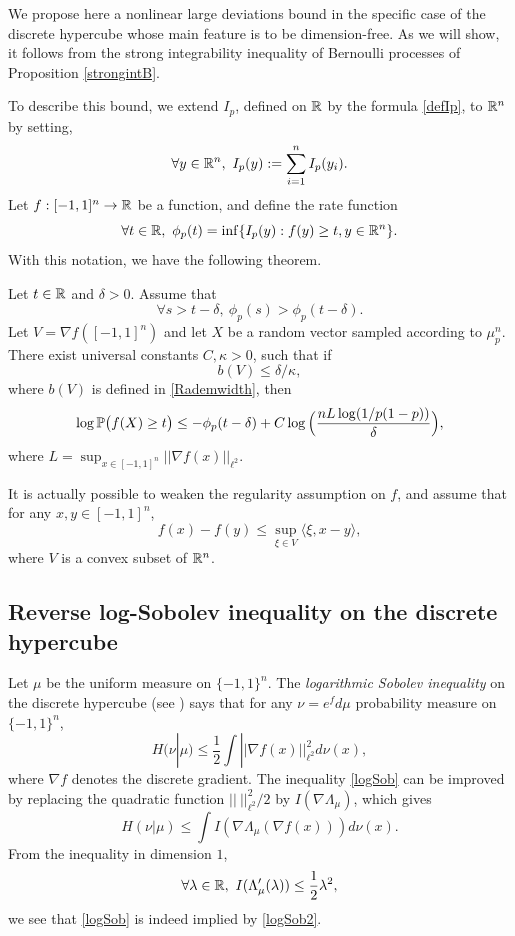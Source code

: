\documentclass[a4paper,oneside,11pt]{article}
\begin{document}
We propose here a nonlinear large deviations bound in the specific case of the discrete hypercube whose main feature is to be dimension-free. As we will show, it follows from the strong integrability inequality of Bernoulli processes of Proposition \ref{strongintB}. 

To describe this bound, we extend $I_p$, defined on $\mathbb{R}$ by the formula \eqref{defIp}, to $\mathbb{R}^n$ by setting,
$$ \forall y \in \mathbb{R}^n, \ I_p(y) := \sum_{i=1}^n I_p(y_i).$$
Let  $f : [-1,1]^n \to \mathbb{R}$ be a function, and define the rate function
$$ \forall t \in \mathbb{R}, \ \phi_p(t) = \inf\{ I_p(y) : f(y) \geq t, y \in \mathbb{R}^n \}.$$
With this notation, we have the following theorem.
\begin{The}\label{NL}Let $t \in \mathbb{R}$ and $\delta>0$. Assume that
$$ \forall s>t-\delta, \ \phi_p(s) > \phi_p(t-\delta).$$
 Let $V = \nabla f([-1,1]^n)$ and let $X$ be a random vector sampled according to $\mu_p^n$. There exist universal constants $C,\kappa>0$, such that if
$$ b(V) \leq  \delta/\kappa ,$$
where $b(V)$ is defined in \eqref{Rademwidth}, then 
$$ \log \mathbb{P}\big( f(X) \geq t \big) \leq - \phi_p(t-\delta) +C\log \Big(\frac{n L \log(1/p(1-p))}{\delta}\Big),$$
where $L= \sup_{x\in[-1,1]^n} || \nabla f(x)||_{\ell^2}$.
\end{The}

\begin{Rem}
It is actually possible to weaken the regularity assumption on $f$, and assume that for any $x,y \in [-1,1]^n$,
$$ f(x) - f(y) \leq \sup_{\xi\in V} \langle \xi, x-y\rangle,$$
where $V$ is a convex subset of $\mathbb{R}^n$.
\end{Rem}


\subsection{Reverse log-Sobolev inequality on the discrete hypercube}
Let $\mu$ be the uniform measure on $\{-1,1\}^n$. The \textit{logarithmic Sobolev inequality}  on the discrete hypercube (see \cite[Theorem 5.1]{BLM}) says that for any $\nu = e^f d\mu$ probability measure on $\{-1,1\}^n$,
\begin{equation}\label{logSob}  H(\nu| \mu) \leq \frac{1}{2} \int || \nabla f (x) ||_{\ell^2}^2 d\nu(x),\end{equation}
where $\nabla f$ denotes the discrete gradient. The inequality \eqref{logSob} can be improved by replacing the quadratic function $|| \ ||_{\ell^2}^2/2$ by $I(\nabla \Lambda_{\mu})$, which gives
\begin{equation} \label{logSob2} H(\nu| \mu) \leq  \int I( \nabla \Lambda_{\mu} ( \nabla f (x))) d\nu(x).\end{equation}
From the inequality in dimension $1$,
$$ \forall \lambda \in \RR, \ I(\Lambda_{\mu}'(\lambda)) \leq \frac{1}{2} \lambda^2,$$
we see that  \eqref{logSob} is indeed implied by \eqref{logSob2}. 
\end{document}
